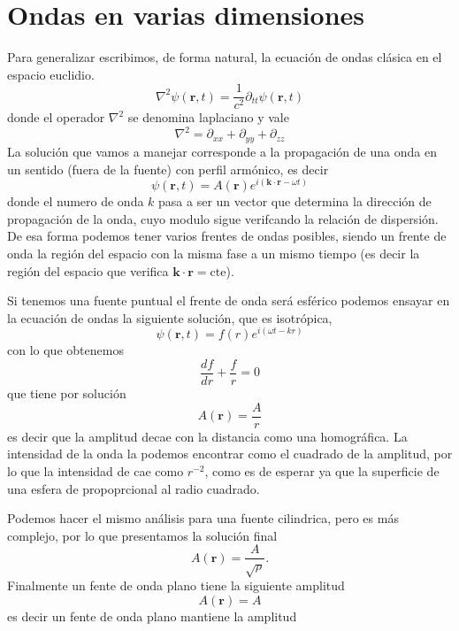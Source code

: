 \documentclass[a4paper,spanish]{article}
\numberwithin{equation}{section}
\begin{document}
\part{Ondas en varias dimensiones}
	Para generalizar escribimos, de forma natural, la ecuaci\'on de ondas cl\'asica en el espacio euclidio.
	\begin{equation}
		\nabla^2 \psi(\textbf{r},t) = \frac{1}{c^2} \partial_{tt} \psi(\textbf{r},t)
		\label{eq:ondas_ecuacion_general}
	\end{equation}
	donde el operador $\nabla^2$ se denomina laplaciano y vale
	\begin{equation}
		\nabla^2 = \partial_{xx} + \partial_{yy} + \partial_{zz}
		\label{eq:laplaciano_cartesianas}
	\end{equation}
	La soluci\'on que vamos a manejar corresponde a la propagaci\'on de una onda en un sentido (fuera de la fuente) con perfil arm\'onico, es decir
	\begin{equation}
		\psi(\textbf{r},t) = A(\textbf{r}) e^{i (\textbf{k} \cdot \textbf{r} - \omega t)}
		\label{eq:ondas_ecuacion_general_solucion}
	\end{equation}
	donde el numero de onda $k$ pasa a ser un vector que determina la direcci\'on de propagaci\'on de la onda, cuyo modulo sigue verifcando la relaci\'on de dispersi\'on. De esa forma podemos tener varios frentes de ondas posibles, siendo un frente de onda la regi\'on del espacio con la misma fase a un mismo tiempo (es decir la regi\'on del espacio que verifica $\textbf{k} \cdot \textbf{r} = \text{cte}$). 
	
	Si tenemos una fuente puntual el frente de onda ser\'a esf\'erico podemos ensayar en la ecuaci\'on de ondas la siguiente soluci\'on, que es isotr\'opica, \[\psi(\textbf{r},t) = f(r) e^{i (\omega t - k r)}\] con lo que obtenemos \[\frac{df}{dr} + \frac{f}{r} = 0\] que tiene por soluci\'on
	\begin{equation}
		A(\textbf{r}) = \frac{A}{r}
		\label{eq:ondas_ecuacion_general_amplitud_esferica}
	\end{equation}
	es decir que la amplitud decae con la distancia como una homogr\'afica. La intensidad de la onda la podemos encontrar como el cuadrado de la amplitud, por lo que la intensidad de cae como $r^{-2}$, como es de esperar ya que la superficie de una esfera de propoprcional al radio cuadrado.
	
	Podemos hacer el mismo an\'alisis para una fuente cilindrica, pero es m\'as complejo, por lo que presentamos la soluci\'on final
	\begin{equation}
		A(\textbf{r}) = \frac{A}{\sqrt{\rho}}.
		\label{eq:ondas_ecuacion_general_amplitud_cilindrica}
	\end{equation}
	Finalmente un fente de onda plano tiene la siguiente amplitud
	\begin{equation}
		A(\textbf{r}) = A
		\label{eq:ondas_ecuacion_general_amplitud_plana}
	\end{equation}
	es decir un fente de onda plano mantiene la amplitud
\end{document}
